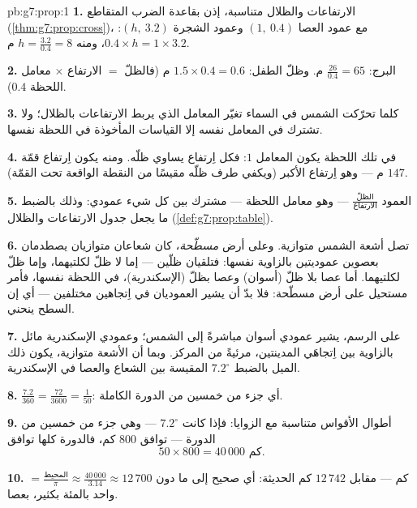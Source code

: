 \begin{solution}{pb:g7:prop:1}
\textbf{1.} الارتفاعات والظلال متناسبة، إذن بقاعدة
الضرب المتقاطع (\cref{thm:g7:prop:cross})، مع عمود العصا
$(1,\ 0.4)$ وعمود الشجرة $(h,\ 3.2)$:
$0.4 \times h = 1 \times 3.2$، ومنه
$h = \frac{3.2}{0.4} = 8$ م.

\textbf{2.} البرج: $\frac{26}{0.4} = 65$ م. وظلّ الطفل:
$1.5 \times 0.4 = 0.6$ م (فالظلّ $=$ الارتفاع $\times$ معامل
اللحظة $0.4$).

\textbf{3.} كلما تحرّكت الشمس في السماء تغيّر المعامل
الذي يربط الارتفاعات بالظلال؛ ولا تشترك في المعامل نفسه إلا
القياسات المأخوذة في اللحظة نفسها.

\textbf{4.} في تلك اللحظة يكون المعامل $1$: فكل اِرتفاع
يساوي ظلّه. ومنه يكون اِرتفاع قمّة 
$147$ م --- وهو اِرتفاع  الأكبر (ويكفي طرف ظلّه
مقيسًا من النقطة الواقعة تحت القمّة).

\textbf{5.}  العمود
$\frac{\text{الظلّ}}{\text{الارتفاع}}$ --- وهو معامل 
اللحظة --- مشترك بين كل شيء
عمودي: وذلك بالضبط ما يجعل جدول الارتفاعات
والظلال  (\cref{def:g7:prop:table}).

\textbf{6.} تصل أشعة الشمس متوازية. وعلى أرض \emph{مسطّحة}،
كان شعاعان متوازيان يصطدمان بعصوين عموديتين بالزاوية
نفسها: فتلقيان ظلّين  --- إما لا ظلّ
لكلتيهما، وإما ظلّ لكلتيهما. أما عصا بلا ظلّ (أسوان)
وعصا بظلّ (الإسكندرية)، في اللحظة نفسها، فأمر
مستحيل على أرض مسطّحة: فلا بدّ أن يشير العموديان في
اِتجاهين مختلفين --- أي إن السطح ينحني.

\textbf{7.} على الرسم، يشير عمودي أسوان مباشرةً
إلى الشمس؛ وعمودي الإسكندرية مائل بالزاوية
بين اِتجاهَي المدينتين، مرئيةً من المركز. وبما أن
الأشعة متوازية، يكون ذلك الميل بالضبط $7.2^\circ$ المقيسة
بين الشعاع والعصا في الإسكندرية.

\textbf{8.} $\frac{7.2}{360} = \frac{72}{3600} = \frac{1}{50}$:
أي جزء من خمسين من الدورة الكاملة.

\textbf{9.} أطوال الأقواس متناسبة مع الزوايا: فإذا كانت
$7.2^\circ$ --- وهي جزء من خمسين من الدورة --- توافق
$800$ كم، فالدورة كلها توافق
\[
50 \times 800 = 40\,000 \text{ كم}.
\]

\textbf{10.}  $= \frac{\text{المحيط}}{\pi}
\approx \frac{40\,000}{3.14} \approx 12\,700$ كم --- مقابل
$12\,742$ كم الحديثة: أي صحيح إلى ما دون واحد بالمئة بكثير،
بعصا.


\end{solution}
